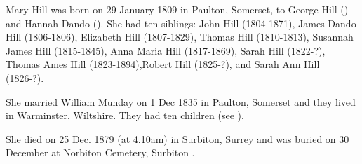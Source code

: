 
Mary Hill was born on 29 January 1809  in Paulton, Somerset, to  George Hill () and Hannah Dando ().\cite{MaryHillBirthDeath}  She had ten siblings:  John Hill (1804-1871), James Dando Hill (1806-1806), Elizabeth Hill (1807-1829), Thomas Hill (1810-1813), Susannah James Hill (1815-1845), Anna Maria Hill (1817-1869), Sarah Hill (1822-?), Thomas Ames Hill (1823-1894),Robert Hill (1825-?), and Sarah Ann Hill (1826-?).

She married William Munday on 1 Dec 1835 in Paulton, Somerset and they lived in Warminster, Wiltshire. They had ten children (see ).  

She died on 25 Dec. 1879 (at 4.10am) in Surbiton, Surrey and was buried on 30 December at Norbiton Cemetery, Surbiton \cite{MaryHillBirthDeath}.

